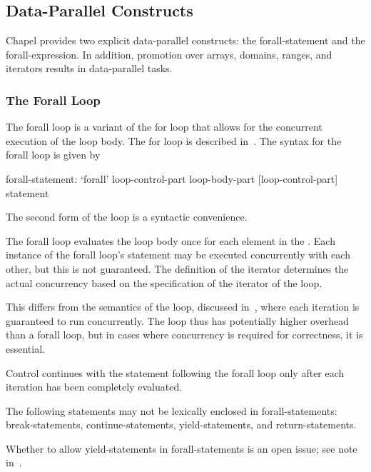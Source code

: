 \subsection{Data-Parallel Constructs}
\label{data_parallelism}

Chapel provides two explicit data-parallel constructs: the
forall-statement and the forall-expression.  In addition, promotion
over arrays, domains, ranges, and iterators results in data-parallel
tasks.

\subsubsection{The Forall Loop}
\label{Forall}

The forall loop is a variant of the for loop that allows for the
concurrent execution of the loop body. The for loop is described
in~. The syntax for the forall loop is given by
\begin{syntax}
forall-statement:
  `forall' loop-control-part loop-body-part
  [loop-control-part] statement
\end{syntax}
The second form of the loop is a syntactic convenience.

The forall loop evaluates the loop body once for each element in
the .  Each instance of the forall loop's
statement may be executed concurrently with each other, but this is
not guaranteed.  The definition of the iterator determines the actual
concurrency based on the specification of the iterator of the loop.

This differs from the semantics of the  loop, discussed
in~, where each iteration is guaranteed to run
concurrently.  The  loop thus has potentially higher
overhead than a forall loop, but in cases where concurrency is
required for correctness, it is essential.

Control continues with the statement following the forall loop only
after each iteration has been completely evaluated.

The following statements may not be lexically enclosed in
forall-statements: break-statements, continue-statements,
yield-statements, and return-statements.

\begin{openissue}
Whether to allow yield-statements in forall-statements is an open
issue; see note in~.
\end{openissue}

